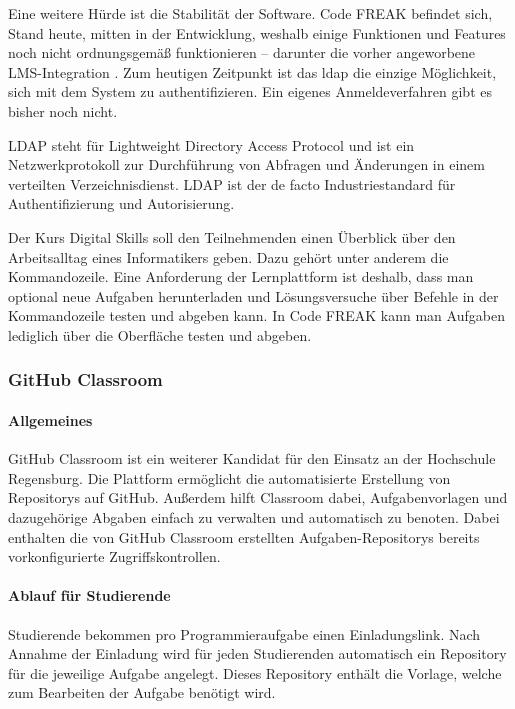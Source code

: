 Eine weitere Hürde ist die Stabilität der Software. Code FREAK befindet sich,
Stand heute, mitten in der Entwicklung, weshalb einige Funktionen und Features
noch nicht ordnungsgemäß funktionieren -- darunter die vorher angeworbene
LMS-Integration \parencite{codefreak-docs}. Zum heutigen Zeitpunkt ist das
\ac{ldap} die einzige Möglichkeit, sich mit dem System zu authentifizieren. Ein
eigenes Anmeldeverfahren gibt es bisher noch nicht.

LDAP steht für Lightweight Directory Access Protocol und ist ein
Netzwerkprotokoll zur Durchführung von Abfragen und Änderungen in einem 
verteilten Verzeichnisdienst. LDAP ist der de facto Industriestandard für
Authentifizierung und Autorisierung. \parencite{ldap}

Der Kurs Digital Skills soll den Teilnehmenden einen Überblick über den
Arbeitsalltag eines Informatikers geben. Dazu gehört unter anderem die
Kommandozeile. Eine Anforderung der Lernplattform ist deshalb, dass man
optional neue Aufgaben herunterladen und Lösungsversuche über Befehle in der
Kommandozeile testen und abgeben kann. In Code FREAK kann man Aufgaben lediglich
über die Oberfläche testen und abgeben.

\newpage
\subsubsection{GitHub Classroom}
\paragraph{Allgemeines}
GitHub Classroom ist ein weiterer Kandidat für den Einsatz an der
Hochschule Regensburg. Die Plattform ermöglicht die automatisierte
Erstellung von Repositorys auf GitHub. Außerdem hilft Classroom dabei,
Aufgabenvorlagen und dazugehörige Abgaben einfach zu verwalten und automatisch
zu benoten. Dabei enthalten die von GitHub Classroom erstellten
Aufgaben-Repositorys bereits vorkonfigurierte Zugriffskontrollen. \parencite{github-classroom-startseite}

\paragraph{Ablauf für Studierende}
Studierende bekommen pro Programmieraufgabe einen Einladungslink. Nach Annahme
der Einladung wird für jeden Studierenden automatisch ein Repository für die
jeweilige Aufgabe angelegt. Dieses Repository enthält die Vorlage, welche zum
Bearbeiten der Aufgabe benötigt wird.

